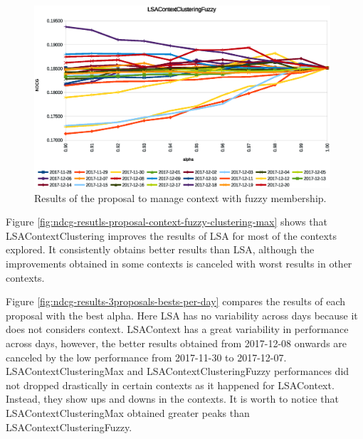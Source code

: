 \documentclass[preprint]{elsarticle}
\begin{document}
\begin{spacing}{1.5}
\begin{figure}[htb]
    \centering
    \includegraphics[width=0.98\textwidth]{figures/ndcg-results-proposal-context-fuzzy-clustering-membership.eps}
    \caption{Results of the proposal to manage context with fuzzy membership.}
    \label{fig:ndcg-results-proposal-context-fuzzy-clustering-membership}
\end{figure}

Figure \ref{fig:ndcg-resutls-proposal-context-fuzzy-clustering-max} shows that LSAContextClustering improves the results of LSA for most of the contexts explored. It consistently obtains better results than LSA, although the improvements obtained in some contexts is canceled with worst results in other contexts.


Figure \ref{fig:ndcg-results-3proposals-bests-per-day} compares the results of each proposal with the best alpha. Here LSA has no variability across days because it does not considers context. LSAContext has a great variability in performance across days, however, the better results obtained from 2017-12-08 onwards are canceled by the low performance from 2017-11-30 to 2017-12-07. LSAContextClusteringMax and LSAContextClusteringFuzzy performances did not dropped drastically in certain contexts as it happened for LSAContext. Instead, they show ups and downs in the contexts. It is worth to notice that LSAContextClusteringMax obtained greater peaks than LSAContextClusteringFuzzy.


\end{spacing}
\end{document}
